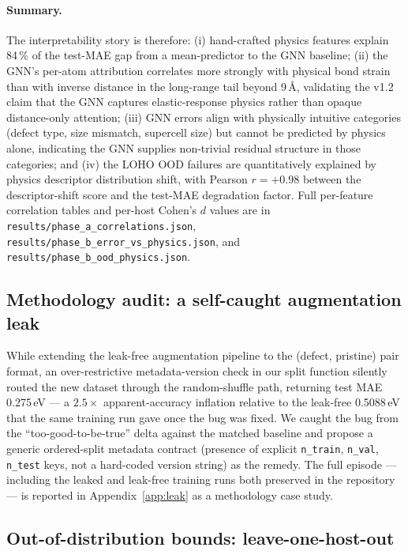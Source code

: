 \documentclass[11pt,a4paper]{article}
\begin{document}
\paragraph{Summary.}
The interpretability story is therefore: (i) hand-crafted physics
features explain 84\,\% of the test-MAE gap from a mean-predictor
to the GNN baseline; (ii) the GNN's per-atom attribution
correlates more strongly with physical bond strain than with
inverse distance in the long-range tail beyond 9\,\AA, validating
the v1.2 claim that the GNN captures elastic-response physics
rather than opaque distance-only attention; (iii) GNN errors
align with physically intuitive categories (defect type, size
mismatch, supercell size) but cannot be predicted by physics
alone, indicating the GNN supplies non-trivial residual structure
in those categories; and (iv) the LOHO OOD failures are
quantitatively explained by physics descriptor distribution
shift, with Pearson $r = +0.98$ between the descriptor-shift
score and the test-MAE degradation factor. Full per-feature
correlation tables and per-host Cohen's $d$ values are in
\texttt{results/phase\_a\_correlations.json},
\texttt{results/phase\_b\_error\_vs\_physics.json}, and
\texttt{results/phase\_b\_ood\_physics.json}.

\subsection{Methodology audit: a self-caught augmentation leak}\label{sec:leak}

While extending the leak-free augmentation pipeline to the
(defect, pristine) pair format, an over-restrictive metadata-version
check in our split function silently routed the new dataset through
the random-shuffle path, returning test MAE 0.275\,eV --- a
$2.5\times$ apparent-accuracy inflation relative to the leak-free
0.5088\,eV that the same training run gave once the bug was fixed.
We caught the bug from the ``too-good-to-be-true'' delta against
the matched baseline and propose a generic ordered-split metadata
contract (presence of explicit \texttt{n\_train}, \texttt{n\_val},
\texttt{n\_test} keys, not a hard-coded version string) as the
remedy. The full episode --- including the leaked and leak-free
training runs both preserved in the repository --- is reported in
Appendix~\ref{app:leak} as a methodology case study.

\subsection{Out-of-distribution bounds: leave-one-host-out}\label{sec:loho}
\end{document}

